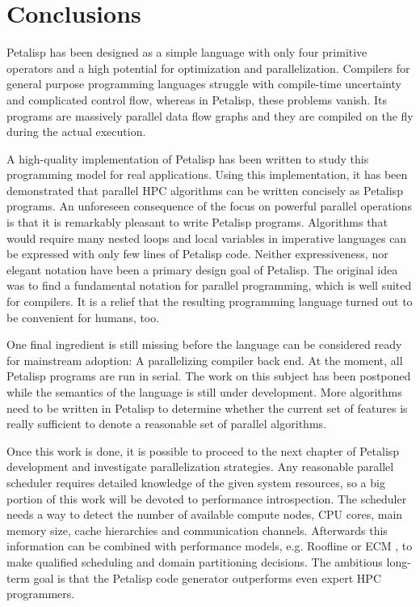 \section{Conclusions}
\label{sec:conclusions}

Petalisp has been designed as a simple language with only four primitive
operators and a high potential for optimization and
parallelization. Compilers for general purpose programming languages
struggle with compile-time uncertainty and complicated control flow,
whereas in Petalisp, these problems vanish. Its programs are massively
parallel data flow graphs and they are compiled on the fly during the
actual execution.

A high-quality implementation of Petalisp has been written to study this
programming model for real applications. Using this implementation, it has
been demonstrated that parallel HPC algorithms can be written concisely as
Petalisp programs. An unforeseen consequence of the focus on powerful
parallel operations is that it is remarkably pleasant to write Petalisp
programs. Algorithms that would require many nested loops and local
variables in imperative languages can be expressed with only few lines of
Petalisp code. Neither expressiveness, nor elegant notation have been a
primary design goal of Petalisp. The original idea was to find a
fundamental notation for parallel programming, which is well suited for
compilers. It is a relief that the resulting programming language turned
out to be convenient for humans, too.

One final ingredient is still missing before the language can be considered
ready for mainstream adoption: A parallelizing compiler back end. At the
moment, all Petalisp programs are run in serial. The work on this subject
has been postponed while the semantics of the language is still under
development. More algorithms need to be written in Petalisp to determine
whether the current set of features is really sufficient to denote a
reasonable set of parallel algorithms.

Once this work is done, it is possible to proceed to the next chapter of
Petalisp development and investigate parallelization strategies. Any
reasonable parallel scheduler requires detailed knowledge of the given
system resources, so a big portion of this work will be devoted to
performance introspection. The scheduler needs a way to detect the number
of available compute nodes, CPU cores, main memory size, cache hierarchies
and communication channels. Afterwards this information can be combined
with performance models, e.g. Roofline \cite{roofline} or ECM \cite{ecm},
to make qualified scheduling and domain partitioning decisions. The
ambitious long-term goal is that the Petalisp code generator outperforms
even expert HPC programmers.
